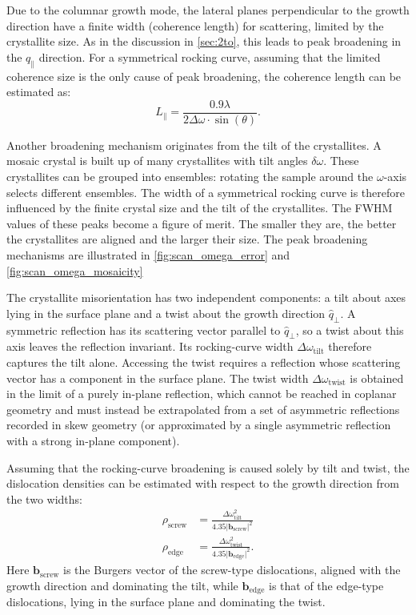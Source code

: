 Due to the columnar growth mode, the lateral planes perpendicular to the growth direction
have a finite width (coherence length) for scattering, limited by the
crystallite size. As in the discussion in \cref{sec:2to}, this leads to peak
broadening in the $q_{\mathrm{\parallel}}$ direction. For a symmetrical rocking curve,
assuming that the limited coherence size is the only cause of peak broadening, the
coherence length can be estimated as:
\begin{equation}
	L_{\parallel}=\frac{0.9 \lambda}{2\Delta\omega\cdot \sin(\theta)}.\label{eq:coherence_length}
\end{equation}

Another broadening mechanism originates from the tilt of the crystallites. A
mosaic crystal is built up of many crystallites with tilt angles $\delta\omega$. These
crystallites can be grouped into ensembles: rotating the sample around the
$\omega$-axis selects different ensembles. The width of a symmetrical rocking curve
is therefore influenced by the finite crystal size and the tilt of the crystallites.
The FWHM values of these peaks become a figure of merit. The smaller they are,
the better the crystallites are aligned and the larger their size. The peak broadening
mechanisms are illustrated in \cref{fig:scan_omega_error} and \cref{fig:scan_omega_mosaicity}

The crystallite misorientation has two independent components: a tilt about axes lying
in the surface plane and a twist about the growth direction $\hat{q}_{\perp}$. A
symmetric reflection has its scattering vector parallel to $\hat{q}_{\perp}$, so a
twist about this axis leaves the reflection invariant. Its rocking-curve width
$\Delta\omega_{\mathrm{tilt}}$ therefore captures the tilt alone. Accessing the twist
requires a reflection whose scattering vector has a component in the surface plane.
The twist width $\Delta\omega_{\mathrm{twist}}$ is obtained in the limit of a
purely in-plane reflection, which cannot be reached in coplanar geometry and must
instead be extrapolated from a set of asymmetric reflections recorded in skew geometry
(or approximated by a single asymmetric reflection with a strong in-plane
component).

Assuming that the rocking-curve broadening is caused solely by tilt and twist,
the dislocation densities can be estimated with respect to the growth direction
from the two widths:
\begin{align}
	\rho_{\mathrm{screw}} & = \frac{\Delta\omega_{\mathrm{tilt}}^{2}}{4.35 \lvert \mathbf{b}_{\mathrm{screw}}\rvert^{2}}\label{eq:rho_screw} \\
	\rho_{\mathrm{edge}}  & = \frac{\Delta\omega_{\mathrm{twist}}^{2}}{4.35 \lvert \mathbf{b}_{\mathrm{edge}}\rvert^{2}}.\label{eq:rho_edge}
\end{align}
Here $\mathbf{b}_{\mathrm{screw}}$ is the Burgers vector of the screw-type dislocations,
aligned with the growth direction and dominating the tilt, while $\mathbf{b}_{\mathrm{edge}}$
is that of the edge-type dislocations, lying in the surface plane and dominating
the twist.

